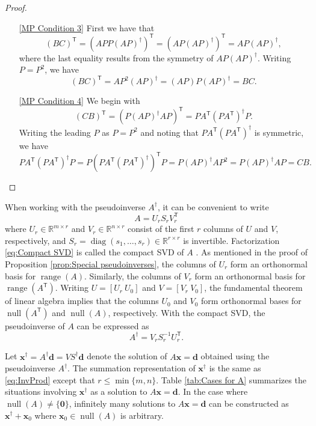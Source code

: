 \documentclass[12pt]{article}
\newcommand{\dVec}{\mathbf{d}}	%
\newcommand{\xVec}{\mathbf{x}}	%
\newcommand{\trans}[1]{{#1}^\mathsf{T}}	%
\newcommand{\inv}[1]{{#1}^{-1}}	%
\newcommand{\pinv}[1]{{#1}^\dagger}	%
\DeclareMathOperator{\diag}{diag}	%
\DeclareMathOperator{\range}{range}	%
\DeclareMathOperator{\nullspace}{null}	%
\newcommand{\zeroVec}{\bm{0}}	%
\newcommand{\singular}{s}	%
\newcommand{\svd}[1]{\widehat{#1}}	%
\begin{document}
\begin{proof}
\begin{enumerate}
\begin{enumerate}
        \item[\ref{MP Condition 3}] First we have that \[\trans{\left(BC\right)} = \trans{\left(APP\pinv{\left(AP\right)}\right)} = \trans{\left(AP\pinv{\left(AP\right)}\right)} = AP\pinv{\left(AP\right)},\]
        where the last equality results from the symmetry of $AP\pinv{\left(AP\right)}$. Writing $P = P^2$, we have
        \[\trans{\left(BC\right)} = AP^2\pinv{\left(AP\right)} = \left(AP\right)P\pinv{\left(AP\right)} = BC.\]
        \item[\ref{MP Condition 4}] We begin with
        \[\trans{\left(CB\right)} = \trans{\left(P\pinv{\left(AP\right)}AP\right)} = P\trans{A}\pinv{\left(P\trans{A}\right)}P.\]
        Writing the leading $P$ as $P = P^2$ and noting that $P\trans{A}\pinv{\left(P\trans{A}\right)}$ is symmetric, we have
        \[P\trans{A}\pinv{\left(P\trans{A}\right)}P = P\trans{\left(P\trans{A}\pinv{\left(P\trans{A}\right)}\right)}P = P\pinv{\left(AP\right)}AP^2 = P\pinv{\left(AP\right)}AP = CB.\]
    \end{enumerate}
\end{enumerate}
\end{proof}


When working with the pseudoinverse $\pinv{A}$, it can be convenient to write
\begin{equation}
\label{eq:Compact SVD}
A = U_rS_r\trans{V}_r
\end{equation}
where $U_r \in \mathbb{R}^{m \times r}$ and $V_r \in \mathbb{R}^{n \times r}$ consist of the first $r$ columns of $U$ and $V$, respectively, and $S_r = \diag(\singular_1,\ldots,\singular_{r}) \in \mathbb{R}^{r \times r}$ is invertible. Factorization \eqref{eq:Compact SVD} is called the compact SVD of $A$ \cite{ABT,Leon2010}. As mentioned in the proof of Proposition \ref{prop:Special pseudoinverses}, the columns of $U_r$ form an orthonormal basis for $\range(A)$. Similarly, the columns of $V_r$ form an orthonormal basis for $\range(\trans{A})$. Writing $U = [U_r ~ U_0]$ and $V = [V_r ~ V_0]$, the fundamental theorem of linear algebra \cite{Strang1993} implies that the columns $U_0$  and $V_0$ form orthonormal bases for $\nullspace(\trans{A})$ and $\nullspace(A)$, respectively. With the compact SVD, the pseudoinverse of $A$ can be expressed as 
\begin{equation}
\label{eq:Pseudoinverse}
    \pinv{A} = V_r\inv{S}_r\trans{U}_r.
\end{equation}

Let $\pinv{\xVec} = \pinv{A}\dVec = V\pinv{S}\svd{\dVec}$ denote the solution of $A\xVec = \dVec$ obtained using the pseudoinverse $\pinv{A}$. The summation representation of $\pinv{\xVec}$ is the same as \eqref{eq:InvProd} except that $r \leq \min\{m,n\}$. Table \ref{tab:Cases for A} summarizes the situations involving $\pinv{\xVec}$ as a solution to $A\xVec = \dVec$. In the case where $\nullspace(A) \neq \{\zeroVec\}$, infinitely many solutions to $A\xVec = \dVec$ can be constructed as $\pinv{\xVec} + \xVec_0$ where $\xVec_0 \in \nullspace(A)$ is arbitrary.
\end{document}
